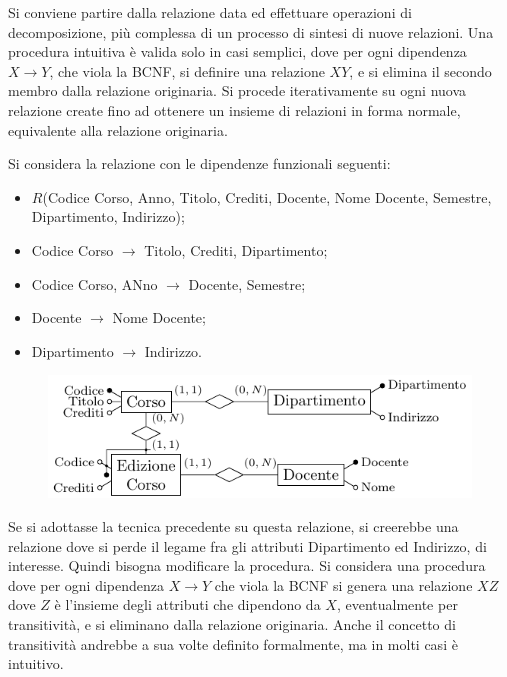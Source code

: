 \documentclass{article}
\numberwithin{equation}{subsection}
\begin{document}
Si conviene partire dalla relazione data ed effettuare operazioni di decomposizione, più complessa di un processo di sintesi di nuove relazioni. 
Una procedura intuitiva è valida solo in casi semplici, dove per ogni dipendenza $X\to Y$, che viola la BCNF, si definire una relazione $XY$, e si elimina il secondo membro  
dalla relazione originaria. Si procede iterativamente su ogni nuova relazione create fino ad ottenere un insieme di relazioni in forma normale, equivalente alla 
relazione originaria. 

Si considera la relazione con le dipendenze funzionali seguenti:
\begin{itemize}
    \item $R$(Codice Corso, Anno, Titolo, Crediti, Docente, Nome Docente, Semestre, Dipartimento, Indirizzo);
    \item Codice Corso $\to$ Titolo, Crediti, Dipartimento;
    \item Codice Corso, ANno $\to$ Docente, Semestre;
    \item Docente $\to$ Nome Docente;
    \item Dipartimento $\to$ Indirizzo. 
\end{itemize}

\begin{figure}[H]%
    \centering%
    \includegraphics{esempio_9-12-24.pdf}%
\end{figure}

Se si adottasse la tecnica precedente su questa relazione, si creerebbe una relazione dove si perde il legame fra gli attributi Dipartimento ed Indirizzo, di 
interesse. Quindi bisogna modificare la procedura. 
Si considera una procedura dove per ogni dipendenza $X\to Y$ che viola la BCNF si genera una relazione $XZ$ dove $Z$ è l'insieme degli attributi che 
dipendono da $X$, eventualmente per transitività, e si eliminano dalla relazione originaria. Anche il concetto di transitività andrebbe a sua volte definito 
formalmente, ma in molti casi è intuitivo. 
\end{document}
